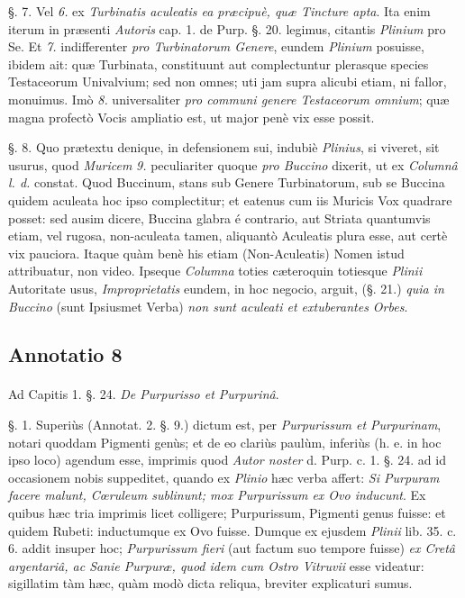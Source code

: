 \documentclass[a4paper, 11pt, oneside, polutonikogreek, german]{article}
\begin{document}
§. 7. Vel \emph{6.} ex \emph{Turbinatis aculeatis ea præcipuè, quæ Tincture apta}. Ita enim iterum in præsenti \emph{Autoris} cap. 1. de Purp. §. 20. legimus, citantis \emph{Plinium} pro Se. Et \emph{7.} indifferenter \emph{pro Turbinatorum Genere}, eundem \emph{Plinium} posuisse, ibidem ait: quæ Turbinata, constituunt aut complectuntur plerasque species Testaceorum Univalvium; sed non omnes; uti jam supra alicubi etiam, ni fallor, monuimus. Imò \emph{8.} universaliter \emph{pro communi genere Testaceorum omnium}; quæ magna profectò Vocis ampliatio est, ut major penè vix esse possit.

§. 8. Quo prætextu denique, in defensionem sui, indubiè \emph{Plinius}, si viveret, sit usurus, quod \emph{Muricem} \emph{9.} peculiariter quoque \emph{pro Buccino} dixerit, ut ex \emph{Columnâ l. d.} constat. Quod Buccinum, stans sub Genere Turbinatorum, sub se Buccina quidem aculeata hoc ipso complectitur; et eatenus cum iis Muricis Vox quadrare posset: sed ausim dicere, Buccina glabra é contrario, aut Striata quantumvis etiam, vel rugosa, non-aculeata tamen, aliquantò Aculeatis plura esse, aut certè vix pauciora. Itaque quàm benè his etiam (Non-Aculeatis) Nomen istud attribuatur, non video. Ipseque \emph{Columna} toties cæteroquin totiesque \emph{Plinii} Autoritate usus, \emph{Improprietatis} eundem, in hoc negocio, arguit, (§. 21.) \emph{quia in Buccino} (sunt Ipsiusmet Verba) \emph{non sunt aculeati et extuberantes Orbes}.

\subsection{Annotatio 8}
\paragraph{}
Ad Capitis 1. §. 24. \emph{De Purpurisso et Purpurinâ}.

§. 1. Superiùs (Annotat. 2. §. 9.) dictum est, per \emph{Purpurissum et Purpurinam}, notari quoddam Pigmenti genùs; et de eo clariùs paulùm, inferiùs (h. e. in hoc ipso loco) agendum esse, imprimis quod \emph{Autor noster} d. Purp. c. 1. §. 24. ad id occasionem nobis suppeditet, quando ex \emph{Plinio} hæc verba affert: \emph{Si Purpuram facere malunt, Cœruleum sublinunt; mox Purpurissum ex Ovo inducunt}. Ex quibus hæc tria imprimis licet colligere; Purpurissum, Pigmenti genus fuisse: et quidem Rubeti: inductumque ex Ovo fuisse. Dumque ex ejusdem \emph{Plinii} lib. 35. c. 6. addit insuper hoc; \emph{Purpurissum fieri} (aut factum suo tempore fuisse) \emph{ex Cretâ argentariâ, ac Sanie Purpuræ, quod idem cum Ostro Vitruvii} esse videatur: sigillatim tàm hæc, quàm modò dicta reliqua, breviter explicaturi sumus.
\end{document}
